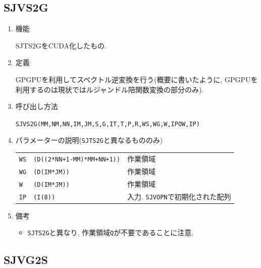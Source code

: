\documentclass[a4j,fleqn]{jarticle}
\begin{document}
\subsection{SJVS2G}

\begin{enumerate}

\item 機能

SJTS2GをCUDA化したもの.

\item 定義

GPGPUを利用してスペクトル逆変換を行う(概要に書いたように, GPGPUを
利用するのは現状ではルジャンドル陪関数変換の部分のみ).

\item 呼び出し方法 

{\tt SJVS2G(MM,NM,NN,IM,JM,S,G,IT,T,P,R,WS,WG,W,IPOW,IP)}
  
\item パラメーターの説明({\tt SJTS2G}と異なるもののみ)

\begin{tabular}{lll}
{\tt WS} & {\tt (D((2*NN+1-MM)*MM+NN+1))} & 作業領域\\
{\tt WG}  & {\tt (D(IM*JM))} & 作業領域\\
{\tt W}  & {\tt (D(IM*JM))} & 作業領域\\
{\tt IP}  & {\tt (I(8))} & 入力. {\tt SJVOPN}で初期化された配列
\end{tabular}

\item 備考

\begin{itemize}
\item {\tt SJTS2G}と異なり, 作業領域{\tt Q}が不要であることに注意.
\end{itemize}

\end{enumerate}


\subsection{SJVG2S}
\end{document}
